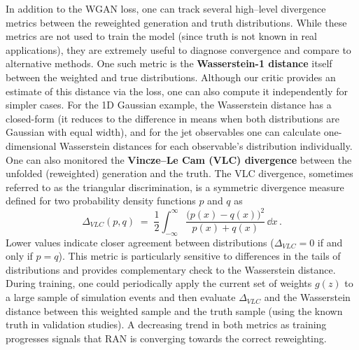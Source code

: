 {{        In addition to the WGAN loss, one can track several high--level divergence metrics between the reweighted generation and truth distributions.
        While these metrics are not used to train the model (since truth is not known in real applications), they are extremely useful to diagnose convergence and compare to alternative methods.
        One such metric is the \textbf{Wasserstein-1 distance} itself between the weighted and true distributions.
        Although our critic provides an estimate of this distance via the loss, one can also compute it independently for simpler cases.
        For the 1D Gaussian example, the Wasserstein distance has a closed-form (it reduces to the difference in means when both distributions are Gaussian with equal width), and for the jet observables one can calculate one-dimensional Wasserstein distances for each observable’s distribution individually.
        One can also monitored the \textbf{Vincze–Le Cam (VLC) divergence}  between the unfolded (reweighted) generation and the truth.
        The VLC divergence, sometimes referred to as the triangular discrimination, is a symmetric divergence measure defined for two probability density functions $p$ and $q$ as
        \[
            \Delta_{VLC}(p,q) \;=\; \frac{1}{2}\int_{-\infty}^{\infty}\frac{\big(p(x)-q(x)\big)^2}{\,p(x)+q(x)\,}\,\dd x\,.
        \]
        Lower values indicate closer agreement between distributions ($\Delta_{VLC}=0$ if and only if $p=q$).
        This metric is particularly sensitive to differences in the tails of distributions and provides complementary check to the Wasserstein distance.
        During training, one could periodically apply the current set of weights $g(z)$ to a large sample of simulation events and then evaluate $\Delta_{VLC}$ and the Wasserstein distance between this weighted sample and the truth sample (using the known truth in validation studies).
        A decreasing trend in both metrics as training progresses signals that RAN is converging towards the correct reweighting.
        
}}
